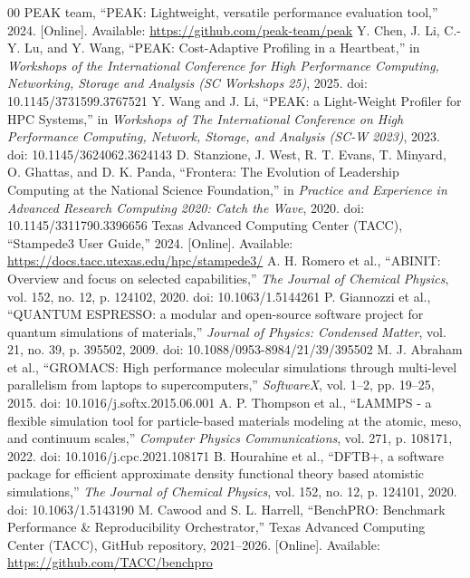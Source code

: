 \documentclass[conference]{IEEEtran}
\begin{document}
\begin{thebibliography}{00}
 PEAK team, ``PEAK: Lightweight, versatile performance evaluation tool,'' 2024. [Online]. Available: \url{https://github.com/peak-team/peak}
 Y. Chen, J. Li, C.-Y. Lu, and Y. Wang, ``PEAK: Cost-Adaptive Profiling in a Heartbeat,'' in \textit{Workshops of the International Conference for High Performance Computing, Networking, Storage and Analysis (SC Workshops 25)}, 2025. doi: 10.1145/3731599.3767521
 Y. Wang and J. Li, ``PEAK: a Light-Weight Profiler for HPC Systems,'' in \textit{Workshops of The International Conference on High Performance Computing, Network, Storage, and Analysis (SC-W 2023)}, 2023. doi: 10.1145/3624062.3624143
 D. Stanzione, J. West, R. T. Evans, T. Minyard, O. Ghattas, and D. K. Panda, ``Frontera: The Evolution of Leadership Computing at the National Science Foundation,'' in \textit{Practice and Experience in Advanced Research Computing 2020: Catch the Wave}, 2020. doi: 10.1145/3311790.3396656
 Texas Advanced Computing Center (TACC), ``Stampede3 User Guide,'' 2024. [Online]. Available: \url{https://docs.tacc.utexas.edu/hpc/stampede3/}
 A. H. Romero et al., ``ABINIT: Overview and focus on selected capabilities,'' \textit{The Journal of Chemical Physics}, vol. 152, no. 12, p. 124102, 2020. doi: 10.1063/1.5144261
 P. Giannozzi et al., ``QUANTUM ESPRESSO: a modular and open-source software project for quantum simulations of materials,'' \textit{Journal of Physics: Condensed Matter}, vol. 21, no. 39, p. 395502, 2009. doi: 10.1088/0953-8984/21/39/395502
 M. J. Abraham et al., ``GROMACS: High performance molecular simulations through multi-level parallelism from laptops to supercomputers,'' \textit{SoftwareX}, vol. 1--2, pp. 19--25, 2015. doi: 10.1016/j.softx.2015.06.001
 A. P. Thompson et al., ``LAMMPS - a flexible simulation tool for particle-based materials modeling at the atomic, meso, and continuum scales,'' \textit{Computer Physics Communications}, vol. 271, p. 108171, 2022. doi: 10.1016/j.cpc.2021.108171
 B. Hourahine et al., ``DFTB+, a software package for efficient approximate density functional theory based atomistic simulations,'' \textit{The Journal of Chemical Physics}, vol. 152, no. 12, p. 124101, 2020. doi: 10.1063/1.5143190
 M. Cawood and S. L. Harrell, ``BenchPRO: Benchmark Performance \& Reproducibility Orchestrator,'' Texas Advanced Computing Center (TACC), GitHub repository, 2021--2026. [Online]. Available: \url{https://github.com/TACC/benchpro}
\end{thebibliography}
\end{document}
